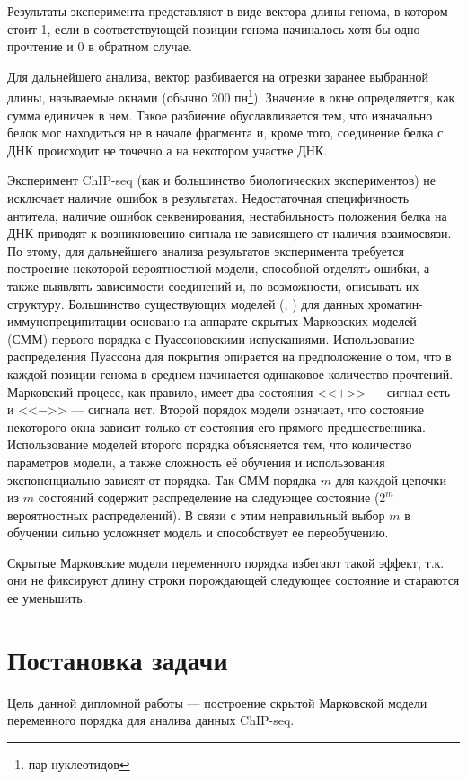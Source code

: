 \documentclass{matmex-diploma-custom}
\begin{document}
Результаты эксперимента представляют в виде вектора длины генома, в котором
стоит 1, если в соответствующей позиции генома начиналось хотя бы одно прочтение
и 0 в обратном случае.

Для дальнейшего анализа, вектор разбивается на отрезки заранее выбранной длины, называемые окнами (обычно 200 пн\footnote{пар нуклеотидов}). Значение в окне определяется, как сумма единичек в нем. 
Такое разбиение обуславливается тем, что изначально белок мог находиться не в начале фрагмента и, кроме того, соединение белка с ДНК происходит не точечно а на некотором участке ДНК.

Эксперимент ChIP-seq (как и большинство биологических
экспериментов) не исключает наличие ошибок в результатах. Недостаточная специфичность антитела, наличие ошибок секвенирования, нестабильность положения белка на ДНК приводят к возникновению сигнала не
зависящего от наличия взаимосвязи.
По этому, для дальнейшего анализа результатов эксперимента требуется построение некоторой вероятностной модели, способной отделять ошибки, а также 
выявлять зависимости соединений и, по возможности, описывать их структуру.
Большинство существующих моделей (\cite{Zhang2008}, \cite{Spyrou2009}) для данных
хроматин-иммунопреципитации основано на аппарате скрытых Марковских моделей (СММ) \cite{Rabiner1989}
первого порядка с Пуассоновскими испусканиями. Использование распределения
Пуассона для покрытия опирается на предположение о том, что в каждой
позиции генома в среднем начинается одинаковое количество прочтений.
\\Марковский процесс, как правило, имеет два состояния <<$+$>> --- сигнал есть и <<$-$>> --- сигнала нет. Второй порядок модели означает, что состояние некоторого окна зависит только от состояния его прямого предшественника.
Использование моделей второго порядка объясняется тем, что количество параметров
модели, а также сложность её обучения и использования экспоненциально зависят от
порядка. Так СММ порядка $ m $ для каждой цепочки из $ m $ состояний содержит распределение на следующее состояние ($ 2^m $ вероятностных распределений). В связи с этим неправильный выбор $ m $ в обучении сильно усложняет модель и способствует ее переобучению. 

Скрытые Марковские модели переменного порядка избегают такой эффект, т.к. они не фиксируют длину строки порождающей следующее состояние и стараются ее уменьшить.

\section{Постановка задачи}
Цель данной дипломной работы --- построение скрытой Марковской модели переменного
порядка для анализа данных ChIP-seq.
\end{document}
